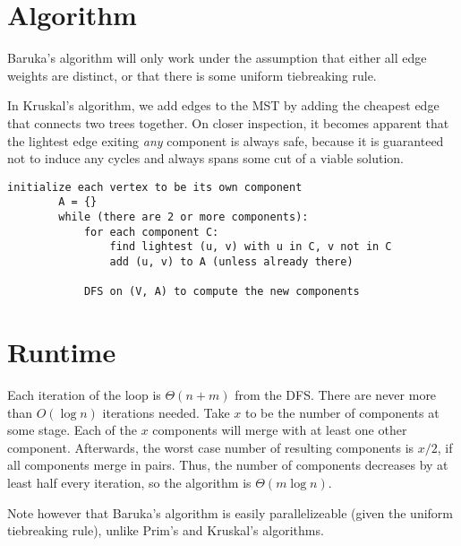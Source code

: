 \documentclass[11pt]{article}
\begin{document}
\section{Algorithm}
	Baruka's algorithm will only work under the assumption that either all edge weights are distinct, or that there is some uniform tiebreaking rule.
	
	In Kruskal's algorithm, we add edges to the MST by adding the cheapest edge that connects two trees together. On closer inspection, it becomes apparent that the lightest edge exiting \textit{any} component is always safe, because it is guaranteed not to induce any cycles and always spans some cut of a viable solution.
	
	\begin{lstlisting}[autogobble=true]
		initialize each vertex to be its own component
		A = {}
		while (there are 2 or more components):
			for each component C:
				find lightest (u, v) with u in C, v not in C
				add (u, v) to A (unless already there)
				
			DFS on (V, A) to compute the new components
	\end{lstlisting}
	
\section{Runtime}
	Each iteration of the loop is $\Theta(n + m)$ from the DFS. There are never more than $O(\log n)$ iterations needed. Take $x$ to be the number of components at some stage. Each of the $x$ components will merge with at least one other component. Afterwards, the worst case number of resulting components is $x / 2$, if all components merge in pairs. Thus, the number of components decreases by at least half every iteration, so the algorithm is $\Theta(m \log n)$.
	
	Note however that Baruka's algorithm is easily parallelizeable (given the uniform tiebreaking rule), unlike Prim's and Kruskal's algorithms.

%		
%		


\end{document}
